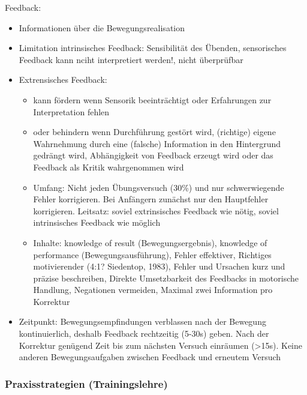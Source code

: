 Feedback:
\begin{itemize}
    \item Informationen über die Bewegungsrealisation
    \item Limitation intrinsisches Feedback: Sensibilität des Übenden, sensorisches Feedback kann nciht interpretiert werden!, nicht überprüfbar
    \item Extrensisches Feedback:
    \begin{itemize}
        \item kann fördern wenn Sensorik beeinträchtigt oder Erfahrungen zur Interpretation fehlen
        \item oder behindern wenn Durchführung gestört wird,  (richtige) eigene Wahrnehmung durch eine (falsche) Information in den Hintergrund gedrängt wird,  Abhängigkeit von Feedback erzeugt wird oder das Feedback als Kritik wahrgenommen wird
        \item Umfang: Nicht jeden Übungsversuch (30\%) und nur schwerwiegende Fehler korrigieren. Bei Anfängern zunächst nur den Hauptfehler korrigieren. Leitsatz: soviel extrinsisches Feedback wie nötig, soviel intrinsisches Feedback wie möglich
        \item Inhalte: knowledge of result (Bewegungsergebnis), knowledge of performance (Bewegungsausführung), Fehler effektiver, Richtiges motivierender (4:1? Siedentop, 1983), Fehler und Ursachen kurz und präzise beschreiben, Direkte Umsetzbarkeit des Feedbacks in motorische Handlung, Negationen vermeiden, Maximal zwei Information pro Korrektur
    \end{itemize}
    \item Zeitpunkt: Bewegungsempfindungen verblassen nach der Bewegung kontinuierlich, deshalb Feedback rechtzeitig (5-30s) geben. Nach der Korrektur genügend Zeit bis zum nächsten Versuch einräumen (>15s). Keine anderen Bewegungsaufgaben zwischen Feedback und erneutem Versuch
\end{itemize}

\subsubsection*{Praxisstrategien (Trainingslehre)}

